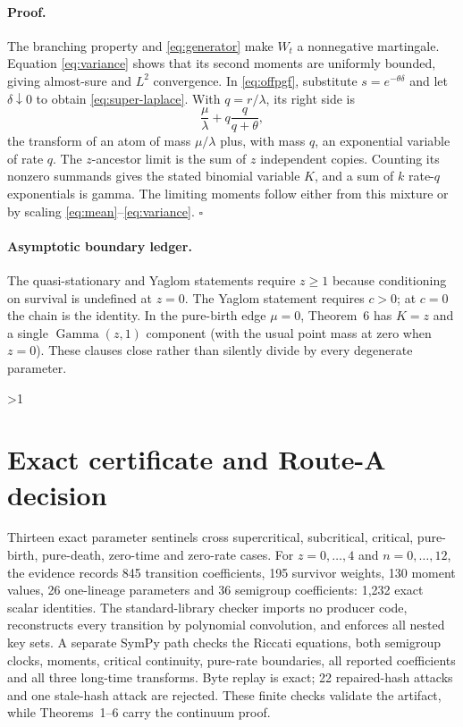 \documentclass[9pt]{extarticle}
\newcommand{\GammaLaw}{\operatorname{Gamma}}
\begin{document}
\paragraph{Proof.}
The branching property and \eqref{eq:generator} make $W_t$ a nonnegative
martingale.  Equation \eqref{eq:variance} shows that its second moments are
uniformly bounded, giving almost-sure and $L^2$ convergence.  In
\eqref{eq:offpgf}, substitute $s=e^{-\theta\delta}$ and let
$\delta\downarrow0$ to obtain \eqref{eq:super-laplace}.  With
$q=r/\lambda$, its right side is
\[
 \frac\mu\lambda+q\frac{q}{q+\theta},
\]
the transform of an atom of mass $\mu/\lambda$ plus, with mass $q$, an
exponential variable of rate $q$.  The $z$-ancestor limit is the sum of $z$
independent copies.  Counting its nonzero summands gives the stated binomial
variable $K$, and a sum of $k$ rate-$q$ exponentials is gamma.  The limiting
moments follow either from this mixture or by scaling
\eqref{eq:mean}--\eqref{eq:variance}. \hfill$\square$

\paragraph{Asymptotic boundary ledger.}
The quasi-stationary and Yaglom statements require $z\geq1$ because
conditioning on survival is undefined at $z=0$.  The Yaglom statement
requires $c>0$; at $c=0$ the chain is the identity.  In the pure-birth edge
$\mu=0$, Theorem~6 has $K=z$ and a single $\GammaLaw(z,1)$ component (with
the usual point mass at zero when $z=0$).  These clauses close rather than
silently divide by every degenerate parameter.
\fi

\ifnum\CRevisionRound>1
\section{Exact certificate and Route-A decision}
Thirteen exact parameter sentinels cross supercritical, subcritical,
critical, pure-birth, pure-death, zero-time and zero-rate cases.  For
$z=0,\ldots,4$ and $n=0,\ldots,12$, the evidence records 845 transition
coefficients, 195 survivor weights, 130 moment values, 26 one-lineage
parameters and 36 semigroup coefficients: 1,232 exact scalar identities.
The standard-library checker imports no producer code, reconstructs every
transition by polynomial convolution, and enforces all nested key sets.
A separate SymPy path checks the Riccati equations, both semigroup clocks,
moments, critical continuity, pure-rate boundaries, all reported
coefficients and all three long-time transforms.  Byte replay is exact; 22
repaired-hash attacks and one stale-hash attack are rejected.  These finite
checks validate the artifact, while Theorems~1--6 carry the continuum proof.
\end{document}
